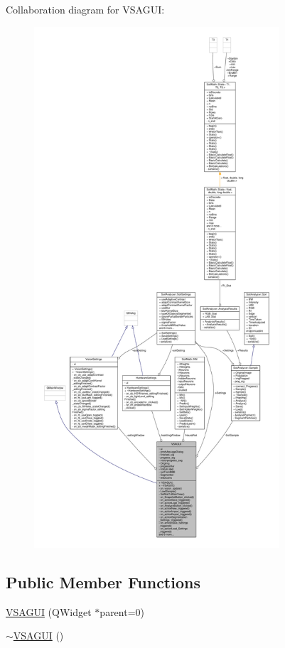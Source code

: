 Collaboration diagram for V\+S\+A\+G\+U\+I\+:\nopagebreak
\begin{figure}[H]
\begin{center}
\leavevmode
\includegraphics[height=550pt]{class_v_s_a_g_u_i__coll__graph}
\end{center}
\end{figure}
\subsection*{Public Member Functions}
\begin{DoxyCompactItemize}
\item 
\hyperlink{class_v_s_a_g_u_i_a987a20380023fe5985bd1fef0491af40}{V\+S\+A\+G\+U\+I} (Q\+Widget $\ast$parent=0)
\item 
\hyperlink{class_v_s_a_g_u_i_ac68bb20d33069fc7f437e7daed3fcc0d}{$\sim$\+V\+S\+A\+G\+U\+I} ()
\end{DoxyCompactItemize}
